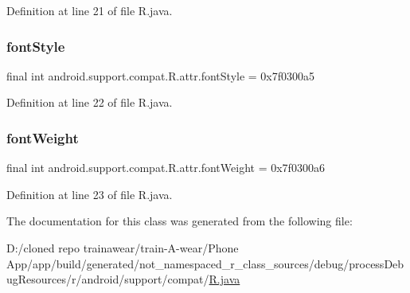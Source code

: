 Definition at line 21 of file R.\+java.

\mbox{\label{classandroid_1_1support_1_1compat_1_1_r_1_1attr_aafb47e665f110a6e8fd90833aefd0e1f}} 
\subsubsection{\texorpdfstring{fontStyle}{fontStyle}}
{\footnotesize\ttfamily final int android.\+support.\+compat.\+R.\+attr.\+font\+Style = 0x7f0300a5\hspace{0.3cm}{\ttfamily [static]}}



Definition at line 22 of file R.\+java.

\mbox{\label{classandroid_1_1support_1_1compat_1_1_r_1_1attr_ab95e33bc7552ac24227086aae1de1973}} 
\subsubsection{\texorpdfstring{fontWeight}{fontWeight}}
{\footnotesize\ttfamily final int android.\+support.\+compat.\+R.\+attr.\+font\+Weight = 0x7f0300a6\hspace{0.3cm}{\ttfamily [static]}}



Definition at line 23 of file R.\+java.



The documentation for this class was generated from the following file\+:\begin{DoxyCompactItemize}
\item 
D\+:/cloned repo trainawear/train-\/\+A-\/wear/\+Phone App/app/build/generated/not\+\_\+namespaced\+\_\+r\+\_\+class\+\_\+sources/debug/process\+Debug\+Resources/r/android/support/compat/\mbox{\hyperlink{process_debug_resources_2r_2android_2support_2compat_2_r_8java}{R.\+java}}\end{DoxyCompactItemize}
